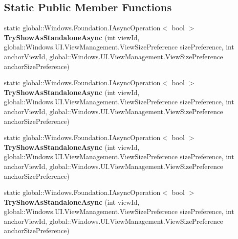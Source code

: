 \subsection*{Static Public Member Functions}
\begin{DoxyCompactItemize}
\item 
\mbox{\label{class_windows_1_1_u_i_1_1_view_management_1_1_application_view_switcher_ab091393eafced0f1736c11e5129f2023}} 
static global\+::\+Windows.\+Foundation.\+I\+Async\+Operation$<$ bool $>$ {\bfseries Try\+Show\+As\+Standalone\+Async} (int view\+Id, global\+::\+Windows.\+U\+I.\+View\+Management.\+View\+Size\+Preference size\+Preference, int anchor\+View\+Id, global\+::\+Windows.\+U\+I.\+View\+Management.\+View\+Size\+Preference anchor\+Size\+Preference)
\item 
\mbox{\label{class_windows_1_1_u_i_1_1_view_management_1_1_application_view_switcher_ab091393eafced0f1736c11e5129f2023}} 
static global\+::\+Windows.\+Foundation.\+I\+Async\+Operation$<$ bool $>$ {\bfseries Try\+Show\+As\+Standalone\+Async} (int view\+Id, global\+::\+Windows.\+U\+I.\+View\+Management.\+View\+Size\+Preference size\+Preference, int anchor\+View\+Id, global\+::\+Windows.\+U\+I.\+View\+Management.\+View\+Size\+Preference anchor\+Size\+Preference)
\item 
\mbox{\label{class_windows_1_1_u_i_1_1_view_management_1_1_application_view_switcher_ab091393eafced0f1736c11e5129f2023}} 
static global\+::\+Windows.\+Foundation.\+I\+Async\+Operation$<$ bool $>$ {\bfseries Try\+Show\+As\+Standalone\+Async} (int view\+Id, global\+::\+Windows.\+U\+I.\+View\+Management.\+View\+Size\+Preference size\+Preference, int anchor\+View\+Id, global\+::\+Windows.\+U\+I.\+View\+Management.\+View\+Size\+Preference anchor\+Size\+Preference)
\item 
\mbox{\label{class_windows_1_1_u_i_1_1_view_management_1_1_application_view_switcher_ab091393eafced0f1736c11e5129f2023}} 
static global\+::\+Windows.\+Foundation.\+I\+Async\+Operation$<$ bool $>$ {\bfseries Try\+Show\+As\+Standalone\+Async} (int view\+Id, global\+::\+Windows.\+U\+I.\+View\+Management.\+View\+Size\+Preference size\+Preference, int anchor\+View\+Id, global\+::\+Windows.\+U\+I.\+View\+Management.\+View\+Size\+Preference anchor\+Size\+Preference)

\end{DoxyCompactItemize}
